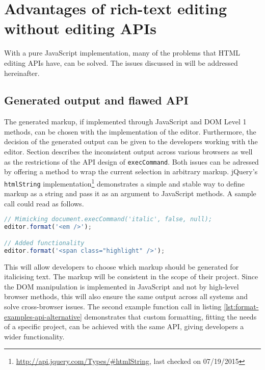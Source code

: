 
\section{Advantages of rich-text editing without editing APIs}

With a pure JavaScript implementation, many of the problems that HTML editing APIs have, can be solved. The issues discussed in  will be addressed hereinafter.

\subsection{Generated output and flawed API} 
\label{subsec:adv_flawed_api}


The generated markup, if implemented through JavaScript and DOM Level 1 methods, can be chosen with the implementation of the editor. Furthermore, the decision of the generated output can be given to the developers working with the editor. Section  describes the inconsistent output across various browsers as well as the restrictions of the API design of \texttt{execCommand}. Both issues can be adressed by offering a method to wrap the current selection in arbitrary markup. jQuery's \texttt{htmlString} implementation\footnote{\url{http://api.jquery.com/Types/\#htmlString}, last checked on 07/19/2015} demonstrates a simple and stable way to define markup as a string and pass it as an argument to JavaScript methods. A sample call could read as follows.

\begin{lstlisting}[language=JavaScript, caption=Example calls to format text, label=lst:format-examples-api-alternative]
// Mimicking document.execCommand('italic', false, null);
editor.format('<em />');

// Added functionality
editor.format('<span class="highlight" />');
\end{lstlisting}

This will allow developers to choose which markup should be generated for italicising text. The markup will be consistent in the scope of their project. Since the DOM manipulation is implemented in JavaScript and not by high-level browser methods, this will also ensure the same output across all systems and solve cross-browser issues. The second example function call in listing \ref{lst:format-examples-api-alternative} demonstrates that custom formatting, fitting the needs of a specific project, can be achieved with the same API, giving developers a wider functionality.


